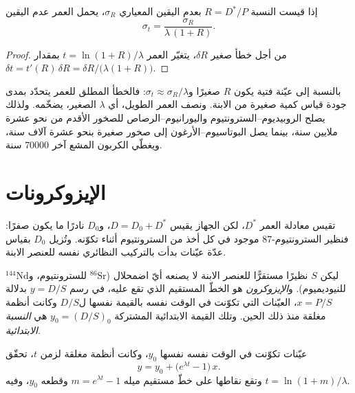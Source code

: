 \begin{proposition}[دقّة العمر]\label{prop:b1:radiometric-methods:precision}
إذا قيست النسبة $R = D^*/P$ بعدم اليقين المعياري $\sigma_R$، يحمل العمر عدم اليقين
\[
  \sigma_t = \frac{\sigma_R}{\lambda\,(1 + R)}.
\]
\end{proposition}

\begin{proof}
من أجل خطأ صغير $\delta R$، يتغيّر العمر $t = \ln(1+R)/\lambda$ بمقدار $\delta t = t'(R)\,\delta R = \delta R/\bigl(\lambda(1 + R)\bigr)$.
\end{proof}

بالنسبة إلى عيّنة فتية يكون $R$ صغيرًا و$\sigma_t \approx \sigma_R/\lambda$: فالخطأ المطلق للعمر يتحدّد بمدى جودة قياس كمية صغيرة من الابنة. ونصف العمر الطويل، أي $\lambda$ الصغير، يضخّمه. ولذلك يصلح الروبيديوم–السترونتيوم واليورانيوم–الرصاص للصخور الأقدم من نحو عشرة ملايين سنة، بينما يصل البوتاسيوم–الأرغون إلى صخور صغيرة بنحو عشرة آلاف سنة، ويغطّي الكربون المشع آخر \num{70000} سنة.

\section{الإيزوكرونات}\label{sec:b1:radiometric-methods:isochrons}

تقيس معادلة العمر $D^*$، لكن الجهاز يقيس $D = D_0 + D^*$، و$D_0$ نادرًا ما يكون صفرًا: فنظير السترونتيوم-87 موجود في كل  أخذ من السترونتيوم أثناء تكوّنه. وتُزيل  $D_0$ بقياس عدّة عيّنات بدأت بالتركيب النظائري نفسه للعنصر الابنة.

\begin{definition}\label{def:b1:radiometric-methods:isochron}
ليكن $S$ نظيرًا مستقرًّا للعنصر الابنة لا يصنعه أيّ اضمحلال ($^{86}\mathrm{Sr}$ للسترونتيوم، و$^{144}\mathrm{Nd}$ للنيوديميوم). و\emph{الإيزوكرون} هو الخطّ المستقيم الذي تقع عليه، في رسم $y = D/S$ بدلالة $x = P/S$، العيّنات التي تكوّنت في الوقت نفسه بالقيمة نفسها ل$D/S$ وكانت أنظمة مغلقة منذ ذلك الحين. وتلك القيمة الابتدائية المشتركة $y_0 = (D/S)_0$ هي \emph{النسبة الابتدائية}.
\end{definition}

\begin{theorem}[الإيزوكرون]\label{thm:b1:radiometric-methods:isochron}
عيّنات تكوّنت في الوقت نفسه  نفسها $y_0$، وكانت أنظمة مغلقة لزمن $t$، تحقّق
\[
  y = y_0 + \bigl(e^{\lambda t} - 1\bigr)\,x .
\]
وتقع نقاطها على خطّ مستقيم ميله $m = e^{\lambda t} - 1$ وقطعه $y_0$، وفيه $t = \ln(1+m)/\lambda$.
\end{theorem}

